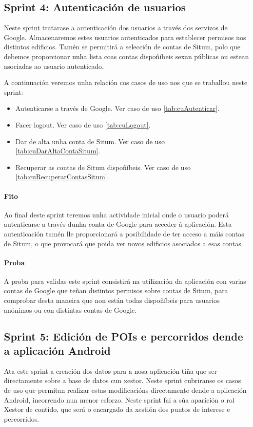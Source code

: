 \subsection{Sprint 4: Autenticación de usuarios}
Neste sprint tratarase a autenticación dos usuarios a través dos servizos de Google. Almacenaremos estes usuarios autenticados para establecer permisos nos distintos edificios. Tamén se permitirá a selección de contas de Situm, polo que debemos proporcionar unha lista coas contas dispoñíbeis sexan públicas ou estean asociadas ao usuario autenticado.

A continuación veremos unha relación cos casos de uso nos que se traballou neste sprint:

\begin{itemize}
	\item Autenticarse a través de Google. Ver caso de uso \ref{tab:cuAutenticar}.
	\item Facer logout. Ver caso de uso \ref{tab:cuLogout}.
	\item Dar de alta unha conta de Situm. Ver caso de uso \ref{tab:cuDarAltaContaSitum}.
	\item Recuperar as contas de Situm dispoñíbeis. Ver caso de uso \ref{tab:cuRecuperarContasSitum}.
\end{itemize}

\paragraph{Fito}
Ao final deste sprint teremos unha actividade inicial onde o usuario poderá autenticarse a través dunha conta de Google para acceder á aplicación. Esta autenticación tamén lle proporcionará a posibilidade de ter acceso a máis contas de Situm, o que provocará que poida ver novos edificios asociados a esas contas.

\paragraph{Proba}
A proba para validas este sprint consistirá na utilización da aplicación con varias contas de Google que teñan distintos permisos sobre contas de Situm, para comprobar desta maneira que non están todas dispoñíbeis para usuarios anónimos ou con distintas contas de Google.

\subsection{Sprint 5: Edición de POIs e percorridos dende a aplicación Android}
Ata este sprint a creación dos datos para a nosa aplicación tiña que ser directamente sobre a base de datos cun xestor. Neste sprint cubriranse os casos de uso que permitan realizar estas modificacións directamente dende a aplicación Android, incorrendo nun menor esforzo. Neste sprint fai a súa aparición o rol Xestor de contido, que será o encargado da xestión dos puntos de interese e percorridos.


